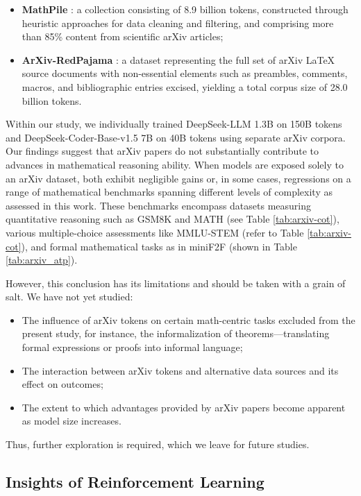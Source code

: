 \begin{itemize}[topsep=0pt]
\begin{itemize}[topsep=0pt]
    \item \textbf{MathPile} \citep{mathpile}: a collection consisting of 8.9 billion tokens, constructed through heuristic approaches for data cleaning and filtering, and comprising more than 85\% content from scientific arXiv articles;
    \item \textbf{ArXiv-RedPajama} \citep{redpajama}: a dataset representing the full set of arXiv LaTeX source documents with non-essential elements such as preambles, comments, macros, and bibliographic entries excised, yielding a total corpus size of 28.0 billion tokens.
\end{itemize}

Within our study, we individually trained DeepSeek-LLM 1.3B on 150B tokens and DeepSeek-Coder-Base-v1.5 7B on 40B tokens using separate arXiv corpora. Our findings suggest that arXiv papers do not substantially contribute to advances in mathematical reasoning ability. When models are exposed solely to an arXiv dataset, both exhibit negligible gains or, in some cases, regressions on a range of mathematical benchmarks spanning different levels of complexity as assessed in this work. These benchmarks encompass datasets measuring quantitative reasoning such as GSM8K and MATH (see Table \ref{tab:arxiv-cot}), various multiple-choice assessments like MMLU-STEM (refer to Table \ref{tab:arxiv-cot}), and formal mathematical tasks as in miniF2F (shown in Table \ref{tab:arxiv_atp}).

However, this conclusion has its limitations and should be taken with a grain of salt. We have not yet studied:

\begin{itemize}[topsep=0pt]
    \item The influence of arXiv tokens on certain math-centric tasks excluded from the present study, for instance, the informalization of theorems—translating formal expressions or proofs into informal language;
    \item The interaction between arXiv tokens and alternative data sources and its effect on outcomes;
    \item The extent to which advantages provided by arXiv papers become apparent as model size increases.
\end{itemize}

Thus, further exploration is required, which we leave for future studies.

\subsection{Insights of Reinforcement Learning}

\end{itemize}
